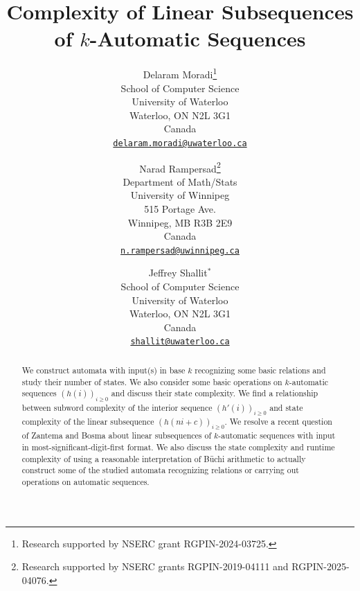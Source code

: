 \documentclass[12pt,reqno]{article}
\begin{document}
\theoremstyle{plain}
\newtheorem{theorem}{Theorem}
\newtheorem{corollary}[theorem]{Corollary}
\newtheorem{lemma}[theorem]{Lemma}
\newtheorem{proposition}[theorem]{Proposition}
\newtheorem{example}[theorem]{Example}
\newtheorem{conjecture}[theorem]{Conjecture}
\newtheorem{openproblem}{Open Problem}
\theoremstyle{definition}
\newtheorem{definition}[theorem]{Definition}
\theoremstyle{remark}
\newtheorem{remark}[theorem]{Remark}

\title{Complexity of Linear Subsequences of $k$-Automatic Sequences}

\author{Delaram Moradi\footnote{Research supported by NSERC grant RGPIN-2024-03725.}\\
School of Computer Science\\
University of Waterloo\\
Waterloo, ON  N2L 3G1 \\
Canada\\
\href{mailto:delaram.moradi@uwaterloo.ca}{\tt delaram.moradi@uwaterloo.ca}\\
\and
Narad Rampersad\footnote{Research supported by NSERC grants RGPIN-2019-04111 and RGPIN-2025-04076.}\\
Department of Math/Stats\\
University of Winnipeg\\
515 Portage Ave.\\
Winnipeg, MB R3B 2E9\\
Canada\\
\href{mailto:n.rampersad@uwinnipeg.ca}{\tt n.rampersad@uwinnipeg.ca}\\
\and 
Jeffrey Shallit$^*$\\
School of Computer Science\\
University of Waterloo\\
Waterloo, ON  N2L 3G1 \\
Canada\\
\href{mailto:shallit@uwaterloo.ca}{\tt shallit@uwaterloo.ca}}

\maketitle

\begin{abstract}
We construct automata with input(s) in base $k$ recognizing some basic relations and study their number of states. 
We also consider some basic operations on $k$-automatic sequences $(h(i))_{i \geq 0}$ and discuss their state complexity.  We find a relationship between subword complexity of the interior sequence $(h'(i))_{i \geq 0}$ and state complexity of the linear subsequence $(h(ni+c))_{i \geq 0}$.   We resolve a recent question of Zantema and Bosma about linear subsequences of $k$-automatic sequences with input in most-significant-digit-first format. We also discuss the state complexity and runtime complexity of using a reasonable interpretation of B\"uchi arithmetic to actually construct some of the studied automata recognizing relations or carrying out operations on automatic sequences.
\end{abstract}
\end{document}
